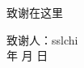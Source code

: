 \begin{thanks}
	致谢在这里
    
    
    \begin{flushright}
        致谢人：sslchi\\
        \the\year{} 年 \the\month{} 月 \the\day{} 日
    \end{flushright}
\end{thanks}